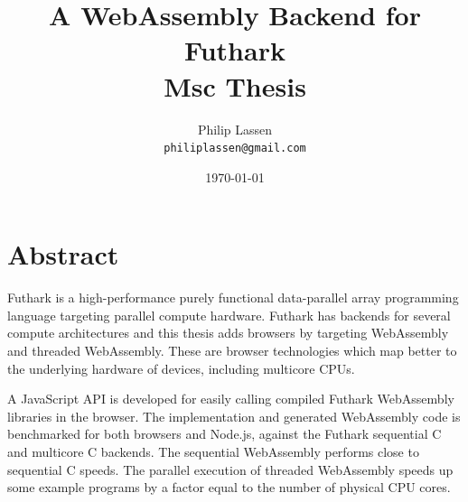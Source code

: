 \documentclass[11pt]{book}
\title{
  \vspace{3cm}
  \Huge{A WebAssembly Backend for Futhark} \\
  \Large{Msc Thesis}
}
\author{
  \Large{Philip Lassen}
  \\ \texttt{philiplassen@gmail.com} \\
}
\date{
    \today
}
\def \ColourPDF {include/natbio-farve}
\def \TitlePDF   {include/nat-en}  %
\newcommand\blankpage{%
    \null
    \thispagestyle{empty}%
    \addtocounter{page}{-1}%
    \newpage}
\begin{document}


\clearpage\maketitle
\thispagestyle{empty}
\setcounter{page}{0}
\afterpage{\blankpage}


\chapter*{Abstract}

Futhark is a high-performance purely functional data-parallel array programming language targeting parallel compute hardware. Futhark has backends for several  compute architectures  and this thesis adds browsers by targeting WebAssembly and threaded WebAssembly. These are browser technologies which map better to the underlying hardware of devices, including multicore CPUs. 

A JavaScript API is developed for easily calling compiled Futhark Web\-Assembly libraries in the browser. 
The implementation and generated Web\-Assembly code is benchmarked for both browsers and Node.js, against the Futhark sequential C and multicore C backends. The sequential Web\-Assembly performs close to sequential C speeds. The parallel execution of threaded Web\-Assembly speeds up some example programs by a factor equal to the number of physical CPU cores.






\tableofcontents
\end{document}
